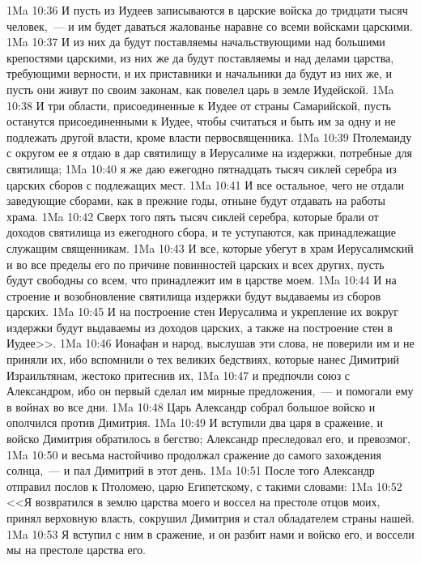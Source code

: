\vs 1Ma 10:36 И пусть из Иудеев записываются в царские войска до тридцати тысяч человек,~--- и им будет даваться жалованье наравне со всеми войсками царскими.
\vs 1Ma 10:37 И из них да будут поставляемы начальствующими над большими крепостями царскими, из них же да будут поставляемы и над делами царства, требующими верности, и их приставники и начальники да будут из них же, и пусть они живут по своим законам, как повелел царь в земле Иудейской.
\vs 1Ma 10:38 И три области, присоединенные к Иудее от страны Самарийской, пусть останутся присоединенными к Иудее, чтобы считаться и быть им за одну и не подлежать другой власти, кроме власти первосвященника.
\vs 1Ma 10:39 Птолемаиду с округом ее я отдаю в дар святилищу в Иерусалиме на издержки, потребные для святилища;
\vs 1Ma 10:40 я же даю ежегодно пятнадцать тысяч сиклей серебра из царских сборов с подлежащих мест.
\vs 1Ma 10:41 И все остальное, чего не отдали заведующие сборами, как в прежние годы, отныне будут отдавать на работы храма.
\vs 1Ma 10:42 Сверх того пять тысяч сиклей серебра, которые брали от доходов святилища из ежегодного сбора, и те уступаются, как принадлежащие служащим священникам.
\vs 1Ma 10:43 И все, которые убегут в храм Иерусалимский и во все пределы его по причине повинностей царских и всех других, пусть будут свободны со всем, что принадлежит им в царстве моем.
\vs 1Ma 10:44 И на строение и возобновление святилища издержки будут выдаваемы из сборов царских.
\vs 1Ma 10:45 И на построение стен Иерусалима и укрепление их вокруг издержки будут выдаваемы из доходов царских, а также на построение стен в Иудее>>.
\vs 1Ma 10:46 Ионафан и народ, выслушав эти слова, не поверили им и не приняли их, ибо вспомнили о тех великих бедствиях, которые нанес Димитрий Израильтянам, жестоко притеснив их,
\vs 1Ma 10:47 и предпочли союз с Александром, ибо он первый сделал им мирные предложения,~--- и помогали ему в войнах во все дни.
\rsbpar\vs 1Ma 10:48 Царь Александр собрал большое войско и ополчился против Димитрия.
\vs 1Ma 10:49 И вступили два царя в сражение, и войско Димитрия обратилось в бегство; Александр преследовал его, и превозмог,
\vs 1Ma 10:50 и весьма настойчиво продолжал сражение до самого захождения солнца,~--- и пал Димитрий в этот день.
\rsbpar\vs 1Ma 10:51 После того Александр отправил послов к Птоломею, царю Египетскому, с такими словами:
\vs 1Ma 10:52 <<Я возвратился в землю царства моего и воссел на престоле отцов моих, принял верховную власть, сокрушил Димитрия и стал обладателем страны нашей.
\vs 1Ma 10:53 Я вступил с ним в сражение, и он разбит нами и войско его, и воссели мы на престоле царства его.

